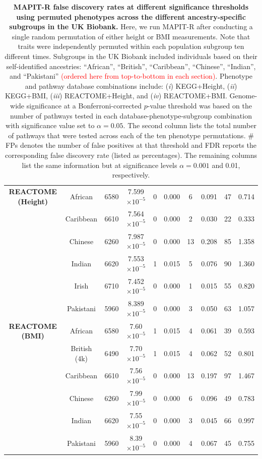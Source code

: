 \documentclass[10pt]{article}
\begin{document}
\begin{landscape}
\begin{table}[ht]
\begin{tabular}{|c|c|c|ccc|cc|cc|}
\multirow{6.5}{*}{\textbf{REACTOME (Height)}} & African & 6580 & 7.599$\times10^{-5}$ & 0 & 0.000 & 6 & 0.091 & 47 & 0.714 \\ 
 & Caribbean & 6610 & 7.564$\times10^{-5}$ & 0 & 0.000 & 2 & 0.030 & 22 & 0.333 \\ 
 & Chinese & 6260 & 7.987$\times10^{-5}$ & 0 & 0.000 & 13 & 0.208 & 85 & 1.358 \\ 
 & Indian & 6620 & 7.553$\times10^{-5}$ & 1 & 0.015 & 5 & 0.076 & 90 & 1.360 \\ 
 & Irish & 6710 & 7.452$\times10^{-5}$ & 0 & 0.000 & 1 & 0.015 & 55 & 0.820 \\
 & Pakistani & 5960 & 8.389$\times10^{-5}$ & 0 & 0.000 & 3 & 0.050 & 63 & 1.057 \\
\hline 
\multirow{6.5}{*}{\textbf{REACTOME (BMI)}} & African & 6580 & 7.60$\times10^{-5}$ & 1 & 0.015 & 4 & 0.061 & 39 & 0.593 \\
 & British (4k) & 6490 & 7.70$\times10^{-5}$ & 1 & 0.015 & 4 & 0.062 & 52 & 0.801 \\
 & Caribbean & 6610 & 7.56$\times10^{-5}$ & 0 & 0.000 & 13 & 0.197 & 97 & 1.467 \\
 & Chinese & 6260 & 7.99$\times10^{-5}$ & 0 & 0.000 & 6 & 0.096 & 49 & 0.783 \\
 & Indian & 6620 & 7.55$\times10^{-5}$ & 0 & 0.000 & 3 & 0.045 & 66 & 0.997 \\
 & Pakistani & 5960 & 8.39$\times10^{-5}$ & 0 & 0.000 & 4 & 0.067 & 45 & 0.755 \\
   \hline
\end{tabular}
\caption[TBD]{\textbf{MAPIT-R false discovery rates at different significance thresholds using permuted phenotypes across the different ancestry-specific subgroups in the UK Biobank.} Here, we run MAPIT-R after conducting a single random permutation of either height or BMI measurements. Note that traits were independently permuted within each population subgroup ten different times. Subgroups in the UK Biobank included individuals based on their self-identified ancestries: ``African'', ``British'', ``Caribbean'', ``Chinese'', ``Indian'', and ``Pakistani'' \textcolor{red}{(ordered here from top-to-bottom in each section)}. Phenotype and pathway database combinations include: (\textit{i}) KEGG+Height, (\textit{ii}) KEGG+BMI, (\textit{iii}) REACTOME+Height, and (\textit{iv}) REACTOME+BMI. Genome-wide significance at a Bonferroni-corrected $p$-value threshold was based on the number of pathways tested in each database-phenotype-subgroup combination with significance value set to $\alpha = 0.05$. The second column lists the total number of pathways that were tested across each of the ten phenotype permutations. \# FPs denotes the number of false positives at that threshold and FDR reports the corresponding false discovery rate (listed as percentages). The remaining columns list the same information but at significance levels $\alpha = 0.001$ and 0.01, respectively.}
\label{InterPath-Supp-Table-AllPops-FDRs}
\end{table}

\end{landscape}
\clearpage
\end{document}
